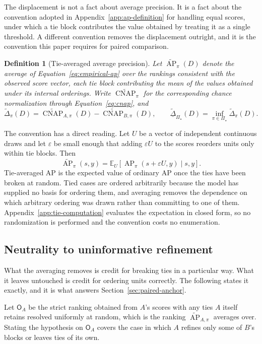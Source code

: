 \documentclass[11pt]{article}
\newcommand{\AP}{\operatorname{AP}}
\newcommand{\CNAP}{\operatorname{CNAP}}
\newcommand{\PSet}{\Pi_\star}
\newcommand{\E}{\mathbb{E}}
\newcommand{\APta}{\widetilde{\AP}}
\newcommand{\CNAPta}{\widetilde{\CNAP}}
\newcommand{\Dta}{\widetilde{\Delta}}
\newcommand{\RobDta}{\underline{\widetilde{\Delta}}_{\PSet}}
\newcommand{\Rank}{\mathsf{O}}
\newtheorem{definition}{Definition}
\theoremstyle{remark}
\begin{document}
The displacement is not a fact about average precision. It is a fact about the convention adopted in Appendix~\ref{app:ap-definition} for handling equal scores, under which a tie block contributes the value obtained by treating it as a single threshold. A different convention removes the displacement outright, and it is the convention this paper requires for paired comparison.

\begin{definition}[Tie-averaged average precision]
Let $\APta_\pi(D)$ denote the average of Equation~\eqref{eq:empirical-ap} over the rankings consistent with the observed score vector, each tie block contributing the mean of the values obtained under its internal orderings. Write $\CNAPta_\pi$ for the corresponding chance normalization through Equation~\eqref{eq:cnap}, and
\[
\Dta_\pi(D)
=
\CNAPta_{A,\pi}(D)-\CNAPta_{B,\pi}(D),
\qquad
\RobDta(D)
=
\inf_{\pi\in\PSet}\Dta_\pi(D).
\]
\end{definition}

The convention has a direct reading. Let $U$ be a vector of independent continuous draws and let $\varepsilon$ be small enough that adding $\varepsilon U$ to the scores reorders units only within tie blocks. Then
\begin{equation}
\APta_\pi(s,y)
=
\E_U\left[\AP_\pi(s+\varepsilon U,y)\mid s,y\right].
\label{eq:jitter}
\end{equation}
Tie-averaged AP is the expected value of ordinary AP once the ties have been broken at random. Tied cases are ordered arbitrarily because the model has supplied no basis for ordering them, and averaging removes the dependence on which arbitrary ordering was drawn rather than committing to one of them. Appendix~\ref{app:tie-computation} evaluates the expectation in closed form, so no randomization is performed and the convention costs no enumeration.

\subsection{Neutrality to uninformative refinement}
\label{sec:refinement}

What the averaging removes is credit for breaking ties in a particular way. What it leaves untouched is credit for ordering units correctly. The following states it exactly, and it is what answers Section~\ref{sec:paired-anchor}.

Let $\Rank_A$ be the strict ranking obtained from $A$'s scores with any ties $A$ itself retains resolved uniformly at random, which is the ranking $\APta_{A,\pi}$ averages over. Stating the hypothesis on $\Rank_A$ covers the case in which $A$ refines only some of $B$'s blocks or leaves ties of its own.
\end{document}
